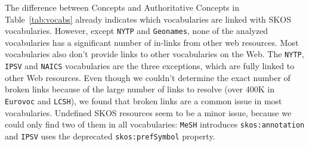 
The difference between Concepts and Authoritative Concepts in Table~\ref{tab:vocabs} already indicates which vocabularies are linked with SKOS vocabularies.
However, except \texttt{NYTP} and \texttt{Geonames}, none of the analyzed vocabularies has a significant number of in-links from other web resources.
Most vocabularies also don't provide links to other vocabularies on the Web. The \texttt{NYTP}, \texttt{IPSV} and \texttt{NAICS} vocabularies are the three exceptions, which are fully linked to other Web resources. 
Even though we couldn't determine the exact number of broken links because of the large number of links to resolve  (over 400K in \texttt{Eurovoc} and \texttt{LCSH}), we found that broken links are a common issue in most vocabularies.
Undefined SKOS resources seem to be a minor issue, because we could only find two of them in all vocabularies: \texttt{MeSH} introduces \texttt{skos:annotation} and \texttt{IPSV} uses the deprecated \texttt{skos:prefSymbol} property.
